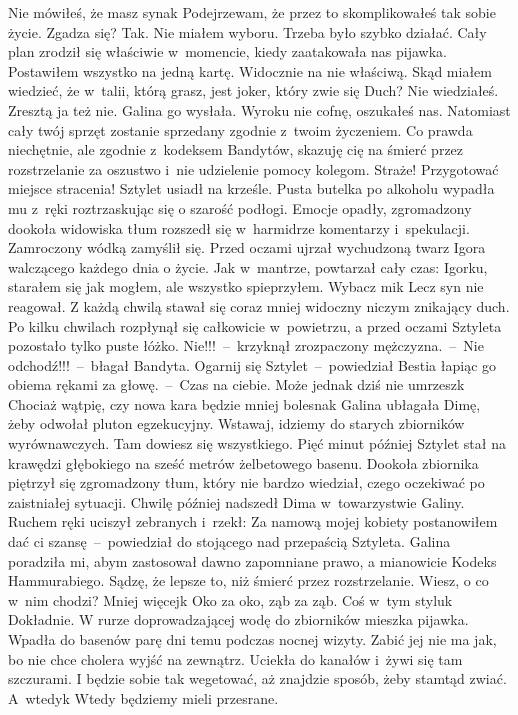 \documentclass[../MAIN.tex]{subfiles}
\begin{document}
\sx
Nie mówiłeś, że masz syna\3k Podejrzewam, że przez to skomplikowałeś tak sobie życie. Zgadza się?
\xx Tak. Nie miałem wyboru. Trzeba było szybko działać. Cały plan zrodził się właściwie w~momencie, kiedy zaatakowała nas pijawka. Postawiłem wszystko na jedną kartę. Widocznie na nie właściwą. Skąd miałem wiedzieć, że w~talii, którą grasz, jest joker, który zwie się Duch?
\xx Nie wiedziałeś. Zresztą ja też nie. Galina go wysłała. Wyroku nie cofnę, oszukałeś nas. Natomiast cały twój sprzęt zostanie sprzedany zgodnie z~twoim życzeniem. Co prawda niechętnie, ale zgodnie z~kodeksem Bandytów, skazuję cię na śmierć przez rozstrzelanie za oszustwo i~nie udzielenie pomocy kolegom. Straże! Przygotować miejsce stracenia!
\qm
Sztylet usiadł na krześle. Pusta butelka po alkoholu wypadła mu z~ręki roztrzaskując się o szarość podłogi. Emocje opadły, zgromadzony dookoła widowiska tłum rozszedł się w~harmidrze komentarzy i~spekulacji. Zamroczony wódką zamyślił się. Przed oczami ujrzał wychudzoną twarz Igora walczącego każdego dnia o życie. Jak w~mantrze, powtarzał cały czas:
\sd
\xx Igorku, starałem się jak mogłem, ale wszystko spieprzyłem. Wybacz mi\3k
\qd
Lecz syn nie reagował. Z każdą chwilą stawał się coraz mniej widoczny niczym znikający duch. Po kilku chwilach rozpłynął się całkowicie w~powietrzu, a przed oczami Sztyleta pozostało tylko puste łóżko.
\sx
Nie!!!~--~krzyknął zrozpaczony mężczyzna.~--~Nie odchodź!!!~--~błagał Bandyta.
\xx Ogarnij się Sztylet~--~powiedział Bestia łapiąc go obiema rękami za głowę.~--~Czas na ciebie. Może jednak dziś nie umrzesz\3k Chociaż wątpię, czy nowa kara będzie mniej bolesna\3k Galina ubłagała Dimę, żeby odwołał pluton egzekucyjny. Wstawaj, idziemy do starych zbiorników wyrównawczych. Tam dowiesz się wszystkiego.
\qm
Pięć minut później Sztylet stał na krawędzi głębokiego na sześć metrów żelbetowego basenu. Dookoła zbiornika piętrzył się zgromadzony tłum, który nie bardzo wiedział, czego oczekiwać po zaistniałej sytuacji. Chwilę później nadszedł Dima w~towarzystwie Galiny. Ruchem ręki uciszył zebranych i~rzekł:
\sx
Za namową mojej kobiety postanowiłem dać ci szansę~--~powiedział do stojącego nad przepaścią Sztyleta. Galina poradziła mi, abym zastosował dawno zapomniane prawo, a mianowicie Kodeks Hammurabiego. Sądzę, że lepsze to, niż śmierć przez rozstrzelanie. Wiesz, o co w~nim chodzi?
\xx Mniej więcej\3k Oko za oko, ząb za ząb. Coś w~tym stylu\3k
\xx Dokładnie. W rurze doprowadzającej wodę do zbiorników mieszka pijawka. Wpadła do basenów parę dni temu podczas nocnej wizyty. Zabić jej nie ma jak, bo nie chce cholera wyjść na zewnątrz. Uciekła do kanałów i~żywi się tam szczurami. I będzie sobie tak wegetować, aż znajdzie sposób, żeby stamtąd zwiać. A~wtedy\3k Wtedy będziemy mieli przesrane.
\end{document}
